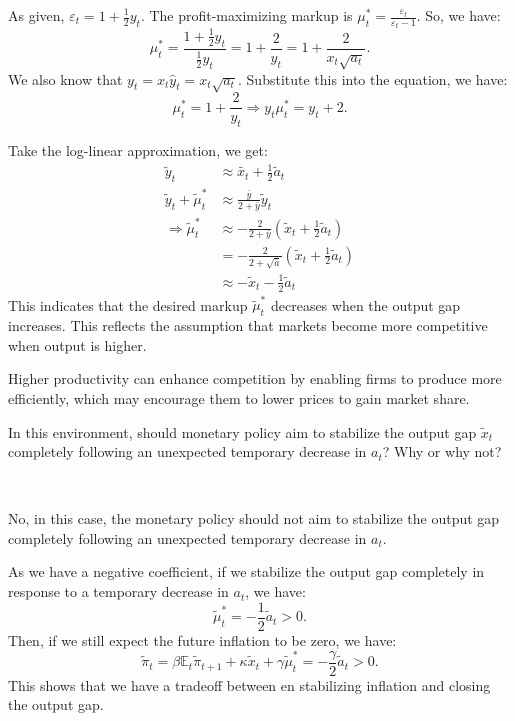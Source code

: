 \begin{solution}
    As given, $\varepsilon_t = 1 + \frac{1}{2}y_t$. The profit-maximizing markup is $\mu_t^* = \frac{\varepsilon_t}{\varepsilon_t - 1}$.
    So, we have:
    \[\mu_t^* = \frac{1 + \frac{1}{2}y_t}{\frac{1}{2}y_t} = 1 + \frac{2}{y_t} = 1 + \frac{2}{x_t \sqrt{a_t} }.\]
    We also know that $y_t = x_t \hat{y}_t = x_t \sqrt{a_t}.$
    Substitute this into the equation, we have:
    \[\mu_t^* = 1 + \frac{2}{y_t} \Rightarrow y_t \mu_t^* = y_t + 2.\]
    
    Take the log-linear approximation, we get:
    \begin{align*}
        \tilde{y}_t & \approx \tilde{x_t} + \frac{1}{2}\tilde{a}_t \\
        \tilde{y}_t + \tilde{\mu}_t^* & \approx \frac{\bar{y}}{2 + \bar{y}}\tilde{y}_t \\
        \Rightarrow \tilde{\mu}_t^* & \approx -\frac{2}{2 + \bar{y}} \left(\tilde{x}_t + \frac{1}{2} \tilde{a}_t\right) \\
        &= -\frac{2}{2 + \sqrt{\bar{a}}} \left(\tilde{x}_t + \frac{1}{2} \tilde{a}_t\right) \\
        & \approx -\tilde{x}_t - \frac{1}{2} \tilde{a}_t
    \end{align*}
    This indicates that the desired markup $\tilde{\mu}_t^*$ decreases 
    when the output gap increases. 
    This reflects the assumption that markets become more competitive 
    when output is higher.

    Higher productivity can enhance competition by enabling firms to produce more efficiently, 
    which may encourage them to lower prices to gain market share.
\end{solution}

\begin{problem*}[e]
    In this environment, should monetary policy aim to stabilize the output gap $\tilde{x}_t$ completely following an unexpected temporary decrease in $a_t$? 
    Why or why not?
\end{problem*}

\begin{solution}
    \
    
    No, in this case, the monetary policy should not aim to stabilize the output gap completely following an unexpected temporary decrease in $a_t$.

    As we have a negative coefficient, if we stabilize the output gap completely in response to a temporary decrease in $a_t$, we have:
    \[\tilde{\mu}_t^* = -\frac{1}{2} \tilde{a}_t > 0.\]
    Then, if we still expect the future inflation to be zero, we have:
    \[\tilde{\pi}_t = \beta \mathbb{E}_t \tilde{\pi}_{t+1} + \kappa \tilde{x}_t + \gamma \tilde{\mu}_t^* = -\frac{\gamma}{2}\tilde{a}_t > 0. \]
    This shows that we have a tradeoff between en stabilizing inflation and closing the output gap.
\end{solution}

